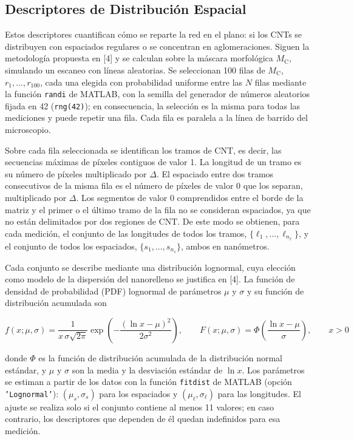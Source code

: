 \subsection{Descriptores de Distribución Espacial}

Estos descriptores cuantifican cómo se reparte la red en el plano: si los CNTs se distribuyen con espaciados regulares o se concentran en aglomeraciones. Siguen la metodología propuesta en [4] y se calculan sobre la máscara morfológica $M_{\mathrm{C}}$, simulando un escaneo con líneas aleatorias. Se seleccionan 100 filas de $M_{\mathrm{C}}$, $r_1, \dots, r_{100}$, cada una elegida con probabilidad uniforme entre las $N$ filas mediante la función \texttt{randi} de MATLAB, con la semilla del generador de números aleatorios fijada en 42 (\texttt{rng(42)}); en consecuencia, la selección es la misma para todas las mediciones y puede repetir una fila. Cada fila es paralela a la línea de barrido del microscopio.

Sobre cada fila seleccionada se identifican los tramos de CNT, es decir, las secuencias máximas de píxeles contiguos de valor 1. La longitud de un tramo es su número de píxeles multiplicado por $\Delta$. El espaciado entre dos tramos consecutivos de la misma fila es el número de píxeles de valor 0 que los separan, multiplicado por $\Delta$. Los segmentos de valor 0 comprendidos entre el borde de la matriz y el primer o el último tramo de la fila no se consideran espaciados, ya que no están delimitados por dos regiones de CNT. De este modo se obtienen, para cada medición, el conjunto de las longitudes de todos los tramos, $\{\ell_1, \dots, \ell_{n_\ell}\}$, y el conjunto de todos los espaciados, $\{s_1, \dots, s_{n_s}\}$, ambos en nanómetros.

Cada conjunto se describe mediante una distribución lognormal, cuya elección como modelo de la dispersión del nanorelleno se justifica en [4]. La función de densidad de probabilidad (PDF) lognormal de parámetros $\mu$ y $\sigma$ y su función de distribución acumulada son

\begin{equation}
f(x;\mu,\sigma) = \frac{1}{x\,\sigma\sqrt{2\pi}} \exp\left(-\frac{(\ln x - \mu)^2}{2\sigma^2}\right), \qquad
F(x;\mu,\sigma) = \Phi\left(\frac{\ln x - \mu}{\sigma}\right), \qquad x > 0
\label{eq:lognormal}
\end{equation}

donde $\Phi$ es la función de distribución acumulada de la distribución normal estándar, y $\mu$ y $\sigma$ son la media y la desviación estándar de $\ln x$. Los parámetros se estiman a partir de los datos con la función \texttt{fitdist} de MATLAB (opción \texttt{'Lognormal'}): $(\mu_s, \sigma_s)$ para los espaciados y $(\mu_\ell, \sigma_\ell)$ para las longitudes. El ajuste se realiza solo si el conjunto contiene al menos 11 valores; en caso contrario, los descriptores que dependen de él quedan indefinidos para esa medición.

